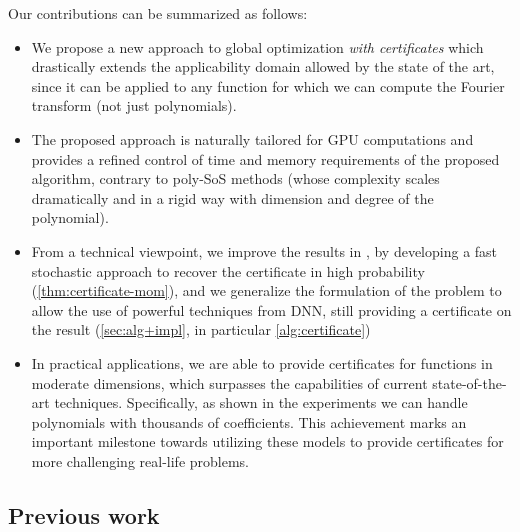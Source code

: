 \documentclass{article}
\begin{document}
Our contributions can be summarized as follows:
\begin{itemize}
  \item We propose a new approach to global optimization \emph{with certificates} which drastically extends the applicability domain allowed by the state of the art, since it can be applied to any function for which we can compute the Fourier transform  (not just polynomials).
  \item The proposed approach is naturally tailored for GPU computations and provides a refined control of time and memory requirements of the proposed algorithm, contrary to poly-SoS methods (whose complexity scales dramatically and in a rigid way with dimension and degree of the polynomial).
  \item From a technical viewpoint, we improve the results in \cite{woodworthNonConvexOptimizationCertificates2022}, by developing a fast stochastic approach to recover the certificate in high probability (\cref{thm:certificate-mom}), and we generalize the formulation of the problem to allow the use of powerful techniques from DNN, still providing a certificate on the result (\cref{sec:alg+impl}, in particular \cref{alg:certificate})
  \item In practical applications, we are able to provide certificates for functions in moderate dimensions, which surpasses the capabilities of current state-of-the-art techniques. Specifically, as shown in the experiments we can handle polynomials with thousands of coefficients. This achievement marks an important milestone towards utilizing these models to provide certificates for more challenging real-life problems.
\end{itemize}


\subsection{Previous work}
\end{document}
